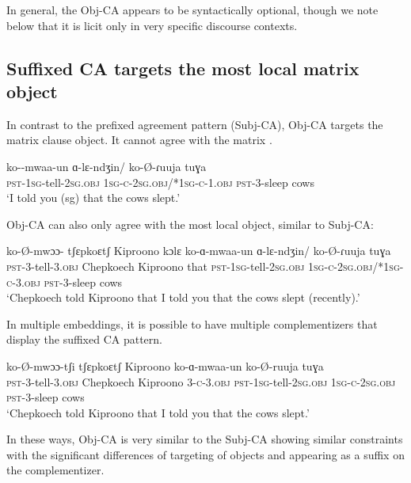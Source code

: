 \documentclass[output=paper,newtxmath,modfonts,nonflat,hidelinks]{langsci/langscibook}
\begin{document}
\noindent In general, the Obj-CA appears to be syntactically optional, though we note below that it is licit only in very specific discourse contexts.  

\subsection{Suffixed CA targets the most local matrix object}

In contrast to the prefixed agreement pattern (Subj-CA), Obj-CA targets the matrix clause object. It cannot agree with the matrix .

\ea 
\gll ko--mwaa-un ɑ-lɛ-ndʒin/ ko-\O-ɾuuja tuɣa \\
\textsc{pst}-1\textsc{sg}-tell-2\textsc{sg}.\textsc{obj} 1\textsc{sg-c-}2\textsc{sg}.\textsc{obj}/*1\textsc{sg-c-}1\textsc{}.\textsc{obj} \textsc{pst}-3-sleep cows \\
\glt `I told you (sg) that the cows slept.'
\z

\noindent Obj-CA can also only agree with the most local object, similar to Subj-CA: 

\ea
\gll ko-\O-mwɔɔ- tʃɛpkoɛtʃ Kiproono kɔlɛ ko-ɑ-mwaa-un ɑ-lɛ-ndʒin/ ko-\O-ɾuuja tuɣa \\
\textsc{pst}-3-tell-3.\textsc{obj} Chepkoech Kiproono that \textsc{pst}-1\textsc{sg}-tell-2\textsc{sg}.\textsc{obj} 1\textsc{sg-c-}2\textsc{sg}.\textsc{obj}/*1\textsc{sg-c-}3.\textsc{obj} \textsc{pst}-3-sleep cows \\
\glt `Chepkoech told Kiproono that I told you that the cows slept (recently).'
\z

\noindent In multiple embeddings, it is possible to have multiple complementizers that display the suffixed CA pattern.

\ea
\gll ko-\O-mwɔɔ-tʃi tʃɛpkoɛtʃ Kiproono  ko-ɑ-mwaa-un  ko-\O-ruuja tuɣa \\
\textsc{pst}-3-tell-3.\textsc{obj} Chepkoech Kiproono 3-\textsc{c}-3.\textsc{obj} \textsc{pst}-1\textsc{sg}-tell-2\textsc{sg}.\textsc{obj} 1\textsc{sg-c-}2\textsc{sg}.\textsc{obj} \textsc{pst}-3-sleep cows \\
\glt `Chepkoech told Kiproono that I told you that the cows slept.'
\z

\noindent In these ways, Obj-CA is very similar to the Subj-CA \textendash showing similar  constraints \textendash with the significant differences of targeting of objects and appearing as a suffix on the complementizer.
\end{document}
